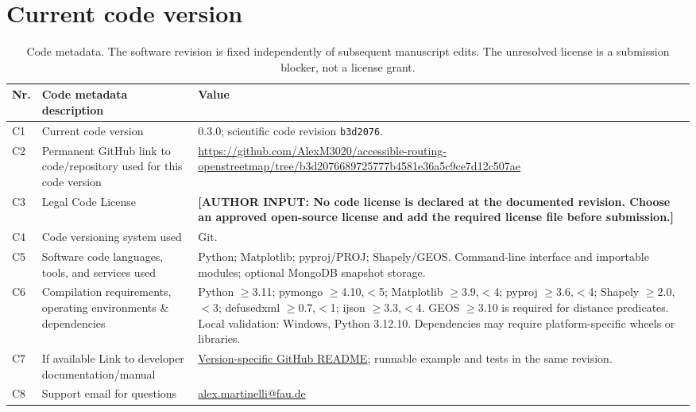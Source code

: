 \documentclass[preprint,12pt,a4paper]{elsarticle}
\newcommand{\CodeVersion}{0.3.0}
\newcommand{\AuthorQuery}[1]{\textcolor{red!65!black}{\textbf{[AUTHOR INPUT: #1]}}}
\begin{document}
\section*{Current code version}
\begin{table}[!ht]
\small
\begin{tabularx}{\textwidth}{@{}p{}>{\raggedright\arraybackslash}p{}Y@{}}
\toprule
\textbf{Nr.} & \textbf{Code metadata description} & \textbf{Value} \\
\midrule
C1 & Current code version & \CodeVersion{}; scientific code revision \texttt{b3d2076}. \\
C2 & Permanent GitHub link to code/repository used for this code version &
\url{https://github.com/AlexM3020/accessible-routing-openstreetmap/tree/b3d2076689725777b4581e36a5c9ce7d12c507ae} \\
C3 & Legal Code License & \AuthorQuery{No code license is declared at the documented revision. Choose an approved open-source license and add the required license file before submission.} \\
C4 & Code versioning system used & Git. \\
C5 & Software code languages, tools, and services used & Python; Matplotlib; pyproj/PROJ; Shapely/GEOS. Command-line interface and importable modules; optional MongoDB snapshot storage. \\
C6 & Compilation requirements, operating environments \& dependencies & Python $\geq$3.11; pymongo $\geq$4.10,$<$5; Matplotlib $\geq$3.9,$<$4; pyproj $\geq$3.6,$<$4; Shapely $\geq$2.0,$<$3; defusedxml $\geq$0.7,$<$1; ijson $\geq$3.3,$<$4. GEOS $\geq$3.10 is required for distance predicates. Local validation: Windows, Python 3.12.10. Dependencies may require platform-specific wheels or libraries. \\
C7 & If available Link to developer documentation/manual &
\href{https://github.com/AlexM3020/accessible-routing-openstreetmap/blob/b3d2076689725777b4581e36a5c9ce7d12c507ae/README.md}{Version-specific GitHub README}; runnable example and tests in the same revision. \\
C8 & Support email for questions & \href{mailto:alex.martinelli@fau.de}{alex.martinelli@fau.de} \\
\bottomrule
\end{tabularx}
\caption{Code metadata. The software revision is fixed independently of subsequent manuscript edits. The unresolved license is a submission blocker, not a license grant.}
\label{tab:metadata}
\end{table}
\clearpage
\end{document}
